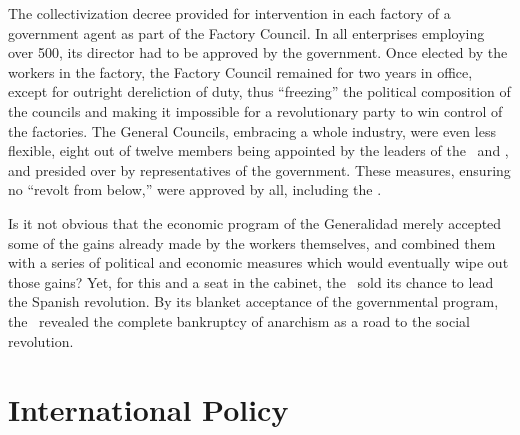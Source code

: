 The collectivization decree provided for intervention in each factory of a government agent as part of the Factory Council. In all enterprises employing over 500, its director had to be approved by the government. Once elected by the workers in the factory, the Factory Council remained for two years in office, except for outright dereliction of duty, thus ``freezing'' the political composition of the councils and making it impossible for a revolutionary party to win control of the factories. The General Councils, embracing a whole industry, were even less flexible, eight out of twelve members being appointed by the leaders of the \UGT\ and \CNT, and presided over by representatives of the government. These measures, ensuring no ``revolt from below,'' were approved by all, including the \POUM.

Is it not obvious that the economic program of the Generalidad merely accepted some of the gains already made by the workers themselves, and combined them with a series of political and economic measures which would eventually wipe out those gains? Yet, for this and a seat in the cabinet, the \POUM\ sold its chance to lead the Spanish revolution. By its blanket acceptance of the governmental program, the \CNT\ revealed the complete bankruptcy of anarchism as a road to the social revolution.

\section{International Policy}

